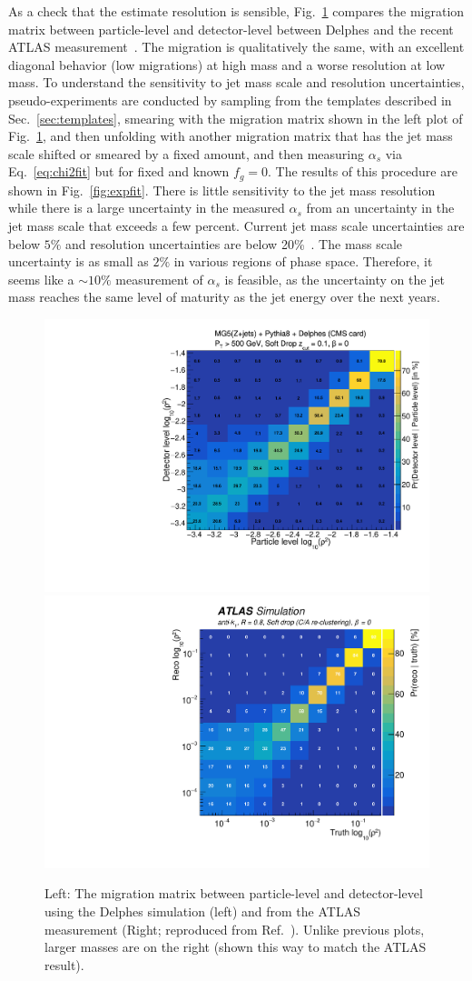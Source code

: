 As a check that the estimate resolution is sensible,
Fig.~\ref{fig:expres} compares the migration matrix between
particle-level and detector-level between Delphes and the recent ATLAS
measurement~\cite{Aaboud:2017qwh}.  The migration is qualitatively the
same, with an excellent diagonal behavior (low migrations) at high
mass and a worse resolution at low mass.  To understand the
sensitivity to jet mass scale and resolution uncertainties,
pseudo-experiments are conducted by sampling from the templates
described in Sec.~\ref{sec:templates}, smearing with the migration
matrix shown in the left plot of Fig.~\ref{fig:expres}, and then unfolding with another migration matrix that has the jet mass scale shifted or smeared by a fixed amount, and then measuring $\alpha_s$ via Eq.~\ref{eq:chi2fit} but for fixed and known $f_g=0$.  The results of this procedure are shown in Fig.~\ref{fig:expfit}.  There is little sensitivity to the jet mass resolution while there is a large uncertainty in the measured $\alpha_s$ from an uncertainty in the jet mass scale that exceeds a few percent.  Current jet mass scale uncertainties are below $5\%$ and resolution uncertainties are below 20\%~\cite{ATLAS-CONF-2017-063,CMS-PAS-JME-16-003}.  The mass scale uncertainty is as small as $2\%$ in various regions of phase space.  Therefore, it seems like a $\sim 10\%$ measurement of $\alpha_s$ is feasible, as the uncertainty on the jet mass reaches the same level of maturity as the jet energy over the next years.

\begin{figure}[h!]
\begin{center}
\includegraphics[width = 0.49\columnwidth]{figures/experimentaldemo/Rho_2D.pdf}\includegraphics[width = 0.49\columnwidth]{figures/figaux_03a.pdf}
\end{center}
\caption{Left: The migration matrix between particle-level and detector-level using the Delphes simulation (left) and from the ATLAS measurement (Right; reproduced from Ref.~\cite{Aaboud:2017qwh}).  Unlike previous plots, larger masses are on the right (shown this way to match the ATLAS result). }
\label{fig:expres}
\end{figure}

